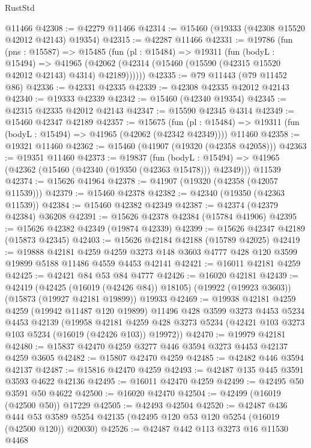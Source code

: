 \begin{lexlean}{RustStd}
\begin{coremodule}
    @11466
@42308 := @42279 @11466
@42314 := @15460 (@19333 (@42308 @15520 @42012 @42143) @19354)
@42315 := @42287 @11466
@42331 := @19786
    (fun (pns : @15587) =>
    @15485
      (fun (pl : @15484) =>
      @19311
        (fun (bodyL : @15494) =>
        @41965 (@42062 (@42314 (@15460 (@15590 (@42315 @15520 @42012 @42143) @4314) @42189))))))
@42335 := @79 @11443 (@79 @11452 @86)
@42336 := @42331 @42335
@42339 := @42308 @42335 @42012 @42143
@42340 := @19333 @42339
@42342 := @15460 (@42340 @19354)
@42345 := @42315 @42335 @42012 @42143
@42347 := @15590 @42345 @4314
@42349 := @15460 @42347 @42189
@42357 := @15675
    (fun (pl : @15484) => @19311 (fun (bodyL : @15494) => @41965 (@42062 (@42342 @42349))))
    @11460
@42358 := @19321 @11460
@42362 := @15460 (@41907 (@19320 (@42358 @42058)))
@42363 := @19351 @11460
@42373 := @19837
    (fun (bodyL : @15494) => @41965 (@42362 (@15460 (@42340 (@19350 (@42363 @15478))) @42349)))
    @11539
@42374 := @15626 @41964
@42378 := @41907 (@19320 (@42358 (@42057 @11539)))
@42379 := @15460 @42378
@42382 := @42340 (@19350 (@42363 @11539))
@42384 := @15460 @42382 @42349
@42387 := @42374 (@42379 @42384) @36208
@42391 := @15626 @42378 @42384 (@15784 @41906)
@42395 := @15626 @42382 @42349 (@19874 @42339)
@42399 := @15626 @42347 @42189 (@15873 @42345)
@42403 := @15626 @42184 @42188 (@15789 @42025)
@42419 := @19888
    @42181
    @4259
    @4259
    @3273
    @148
    @3603
    @4777
    @428
    @120
    @3599
    @19899
    @5188
    @11486
    @4559
    @4453
    @42141
@42421 := @16011 @42181 @4259
@42425 := @42421 @84 @53 @84 @4777
@42426 := @16020 @42181
@42439 := @42419
    (@42425 (@16019 (@42426 @84)) @18105)
    (@19922 (@19923 @3603))
    (@15873 (@19927 @42181 @19899))
    @19933
@42469 := @19938
    @42181
    @4259
    @4259
    (@19942 @11487 @120 @19899)
    @11496
    @428
    @3599
    @3273
    @4453
    @5234
    @4453
    @42139
    (@19958
      @42181
      @4259
      @428
      @3273
      @5234
      (@42421 @103 @3273 @103 @5234 (@16019 (@42426 @103)) @19972))
@42470 := @19979 @42181
@42480 := @15837 @42470 @4259 @3277 @446 @3594 @3273 @4453 @42137 @4259 @3605
@42482 := @15807 @42470 @4259
@42485 := @42482 @446 @3594 @42137
@42487 := @15816 @42470 @4259
@42493 := @42487 @135 @445 @3591 @3593 @4622 @42136
@42495 := @16011 @42470 @4259
@42499 := @42495 @50 @3591 @50 @4622
@42500 := @16020 @42470
@42504 := @42499 (@16019 (@42500 @50)) @17229
@42505 := @42493 @42504
@42520 := @42487
    @436
    @444
    @53
    @3589
    @5254
    @42135
    (@42495 @120 @53 @120 @5254 (@16019 (@42500 @120)) @20030)
@42526 := @42487 @442 @113 @3273 @16 @11530 @4468

\end{coremodule}
\end{lexlean}
